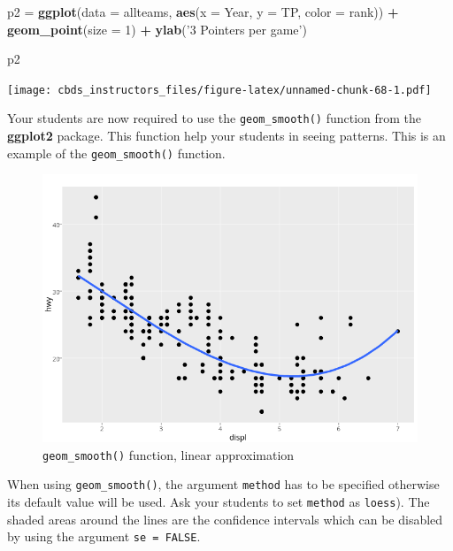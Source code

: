\documentclass[]{book}
\newenvironment{Shaded}{\begin{snugshade}}{\end{snugshade}}
\newcommand{\DataTypeTok}[1]{\textcolor[rgb]{0.13,0.29,0.53}{#1}}
\newcommand{\DecValTok}[1]{\textcolor[rgb]{0.00,0.00,0.81}{#1}}
\newcommand{\KeywordTok}[1]{\textcolor[rgb]{0.13,0.29,0.53}{\textbf{#1}}}
\newcommand{\NormalTok}[1]{#1}
\newcommand{\OperatorTok}[1]{\textcolor[rgb]{0.81,0.36,0.00}{\textbf{#1}}}
\newcommand{\StringTok}[1]{\textcolor[rgb]{0.31,0.60,0.02}{#1}}
\begin{document}
\begin{Shaded}
\begin{Highlighting}[]
\NormalTok{p2 =}\StringTok{ }\KeywordTok{ggplot}\NormalTok{(}\DataTypeTok{data =}\NormalTok{ allteams, }\KeywordTok{aes}\NormalTok{(}\DataTypeTok{x =}\NormalTok{ Year, }\DataTypeTok{y =}\NormalTok{ TP, }\DataTypeTok{color =}\NormalTok{ rank)) }\OperatorTok{+}
\StringTok{    }\KeywordTok{geom_point}\NormalTok{(}\DataTypeTok{size =} \DecValTok{1}\NormalTok{) }\OperatorTok{+}
\StringTok{    }\KeywordTok{ylab}\NormalTok{(}\StringTok{'3 Pointers per game'}\NormalTok{)}

\NormalTok{p2}
\end{Highlighting}
\end{Shaded}

\texttt{[image: cbds\_instructors\_files/figure-latex/unnamed-chunk-68-1.pdf]}

Your students are now required to use the \texttt{geom\_smooth()} function from the \textbf{ggplot2} package. This function help your students in seeing patterns. This is an example of the \texttt{geom\_smooth()} function.

\begin{figure}
\centering
\includegraphics{./images/07_visualization_geom_smooth.png}
\caption{\texttt{geom\_smooth()} function, linear approximation}
\end{figure}

When using \texttt{geom\_smooth()}, the argument \texttt{method} has to be specified otherwise its default value will be used. Ask your students to set \texttt{method} as \texttt{\textquotesingle{}loess\textquotesingle{}}). The shaded areas around the lines are the confidence intervals which can be disabled by using the argument \texttt{se\ =\ FALSE}.
\end{document}
